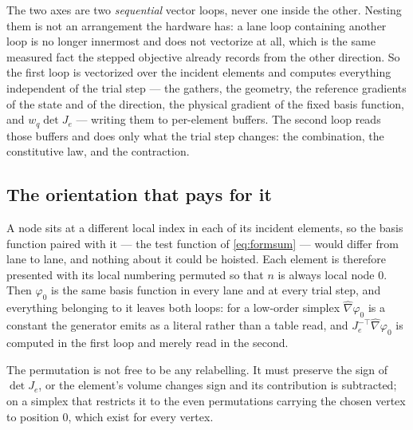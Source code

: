 \documentclass[11pt]{article}
\begin{document}
The two axes are two \emph{sequential} vector loops, never one inside the other.
Nesting them is not an arrangement the hardware has: a lane loop containing
another loop is no longer innermost and does not vectorize at all, which is the
same measured fact the stepped objective already records from the other
direction.  So the first loop is vectorized over the incident elements and
computes everything independent of the trial step --- the gathers, the geometry,
the reference gradients of the state and of the direction, the physical gradient
of the fixed basis function, and $w_q\det J_e$ --- writing them to per-element
buffers.  The second loop reads those buffers and does only what the trial step
changes: the combination, the constitutive law, and the contraction.

\subsection*{The orientation that pays for it}

A node sits at a different local index in each of its incident elements, so the
basis function paired with it --- the test function of \eqref{eq:formsum} ---
would differ from lane to lane, and nothing about it could be hoisted.  Each
element is therefore presented with its local numbering permuted so that $n$ is
always local node $0$.  Then $\varphi_0$ is the same basis function in every lane
and at every trial step, and everything belonging to it leaves both loops: for a
low-order simplex $\widehat\nabla\varphi_0$ is a constant the generator emits as
a literal rather than a table read, and $J_e^{-\top}\widehat\nabla\varphi_0$ is
computed in the first loop and merely read in the second.

The permutation is not free to be any relabelling.  It must preserve the sign of
$\det J_e$, or the element's volume changes sign and its contribution is
subtracted; on a simplex that restricts it to the even permutations carrying the
chosen vertex to position $0$, which exist for every vertex.
\end{document}
